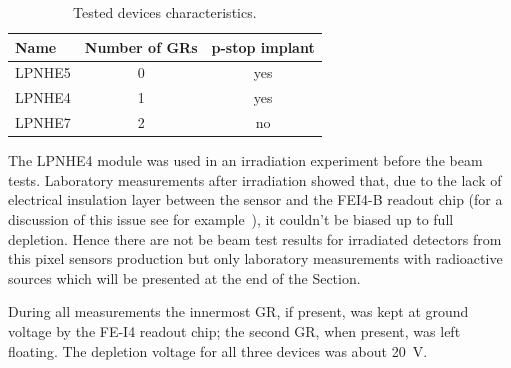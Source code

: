 \begin{table}[!htbp]
\centering
\caption{\label{tab:device_charact}Tested devices characteristics.}
\smallskip
\begin{tabular}{lcc}
\hline
\hline
Name&Number of GRs& p-stop implant\\
\hline
LPNHE5 & 0 & yes\\
LPNHE4 & 1 & yes\\
LPNHE7 & 2 & no\\
\hline
\end{tabular}
\end{table}


The LPNHE4 module was used in an irradiation experiment before the beam tests. Laboratory measurements after irradiation showed that, due to the lack of  electrical insulation layer
between the sensor and the FEI4-B readout chip (for a discussion of this issue see for example~\cite{rossi2006pixel}), it couldn't be biased up to full depletion. Hence there are not be
beam test results for irradiated detectors from this pixel sensors production but only laboratory 
measurements with radioactive sources which will be presented at the end of the Section.


During all measurements the innermost GR, if present, was kept at
 ground voltage by the FE-I4 readout chip; the second GR, when present, was left floating. The depletion voltage for all three devices was about 20~V.

